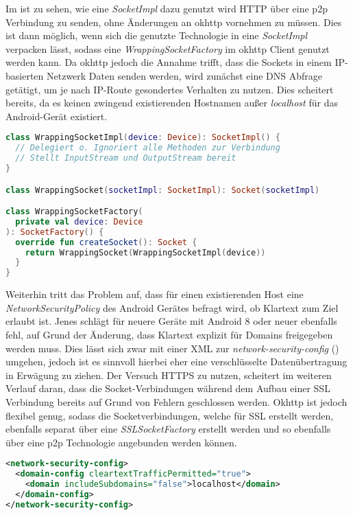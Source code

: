         Im  ist zu sehen, wie eine {\it SocketImpl} dazu genutzt wird HTTP über eine p2p Verbindung zu senden, ohne Änderungen an okhttp vornehmen zu müssen. Dies ist dann möglich, wenn sich die genutzte Technologie in eine {\it SocketImpl} verpacken lässt, sodass eine {\it WrappingSocketFactory} im okhttp Client genutzt werden kann. Da okhttp jedoch die Annahme trifft, dass die Sockets in einem IP-basierten Netzwerk Daten senden werden, wird zunächst eine DNS Abfrage getätigt, um je nach IP-Route gesondertes Verhalten zu nutzen. Dies scheitert bereits, da es keinen zwingend existierenden Hostnamen außer {\it localhost} für das Android-Gerät existiert.
        \begin{lstlisting}[frame=bt, label={lst:android:socketfactory}, language=Kotlin, caption=HTTP Kapselung als SocketFactory (Clientcode in Kotlin)]
class WrappingSocketImpl(device: Device): SocketImpl() {
  // Delegiert o. Ignoriert alle Methoden zur Verbindung
  // Stellt InputStream und OutputStream bereit
}

class WrappingSocket(socketImpl: SocketImpl): Socket(socketImpl)

class WrappingSocketFactory(
  private val device: Device
): SocketFactory() {
  override fun createSocket(): Socket {
    return WrappingSocket(WrappingSocketImpl(device))
  }
}
        \end{lstlisting}        
        
        Weiterhin tritt das Problem auf, dass für einen existierenden Host eine {\it NetworkSecurityPolicy} des Android Gerätes befragt wird, ob Klartext zum Ziel erlaubt ist. Jenes schlägt für neuere Geräte mit Android 8 oder neuer ebenfalls fehl, auf Grund der Änderung, dass Klartext explizit für Domains freigegeben werden muss. Dies lässt sich zwar mit einer XML zur {\it network-security-config} () umgehen, jedoch ist es sinnvoll hierbei eher eine verschlüsselte Datenübertragung in Erwägung zu ziehen. Der Versuch HTTPS zu nutzen, scheitert im weiteren Verlauf daran, dass die Socket-Verbindungen während dem Aufbau einer SSL Verbindung bereits auf Grund von Fehlern geschlossen werden. Okhttp ist jedoch flexibel genug, sodass die Socketverbindungen, welche für SSL erstellt werden, ebenfalls separat über eine {\it SSLSocketFactory} erstellt werden und so ebenfalls über eine p2p Technologie angebunden werden können.
        
        \begin{lstlisting}[frame=bt, label={lst:android:networksecurity}, language=XML, caption=Sicherheitskonfiguration für erlaube Klartexthosts (Clientcode in XML)]
<network-security-config>
  <domain-config cleartextTrafficPermitted="true">
    <domain includeSubdomains="false">localhost</domain>
  </domain-config>
</network-security-config>
        \end{lstlisting}
        

